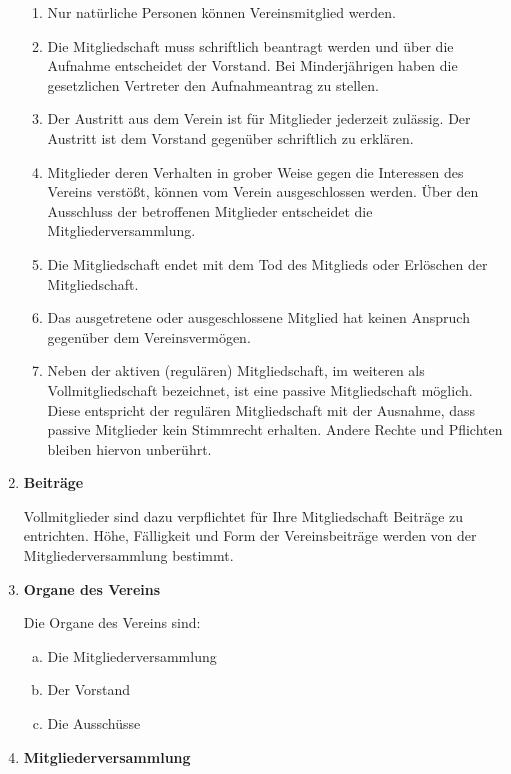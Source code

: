 \documentclass[a4paper,11pt]{article}
\begin{document}
\begin{enumerate}[§ 1.]
\begin{enumerate}[1.]
\item Nur natürliche Personen können Vereinsmitglied werden.
\item Die Mitgliedschaft muss schriftlich beantragt werden und über die Aufnahme entscheidet der
Vorstand. Bei Minderjährigen haben die gesetzlichen Vertreter den Aufnahmeantrag zu stellen.
\item Der Austritt aus dem Verein ist für Mitglieder jederzeit zulässig. Der Austritt ist dem Vorstand
gegenüber schriftlich zu erklären.
\item Mitglieder deren Verhalten in grober Weise gegen die Interessen des Vereins verstößt, können
vom Verein ausgeschlossen werden. Über den Ausschluss der betroffenen Mitglieder
entscheidet die Mitgliederversammlung.
\item Die Mitgliedschaft endet mit dem Tod des Mitglieds oder Erlöschen der Mitgliedschaft.
\item Das ausgetretene oder ausgeschlossene Mitglied hat keinen Anspruch gegenüber dem
Vereinsvermögen.
\item Neben der aktiven (regulären) Mitgliedschaft, im weiteren als Vollmitgliedschaft bezeichnet, ist
eine passive Mitgliedschaft möglich. Diese entspricht der regulären Mitgliedschaft mit der Ausnahme, dass passive Mitglieder kein Stimmrecht erhalten. Andere Rechte und Pflichten bleiben hiervon unberührt.
\end{enumerate}

\item \textsf{\textbf{Beiträge}}

Vollmitglieder sind dazu verpflichtet für Ihre Mitgliedschaft Beiträge zu entrichten. Höhe, Fälligkeit und Form der Vereinsbeiträge werden von der Mitgliederversammlung bestimmt.

\item \textsf{\textbf{Organe des Vereins}}

Die Organe des Vereins sind:
\begin{enumerate}[a)]
\item Die Mitgliederversammlung
\item Der Vorstand
\item Die Ausschüsse
\end{enumerate}

\item \textsf{\textbf{Mitgliederversammlung}}


\end{enumerate}
\end{document}

